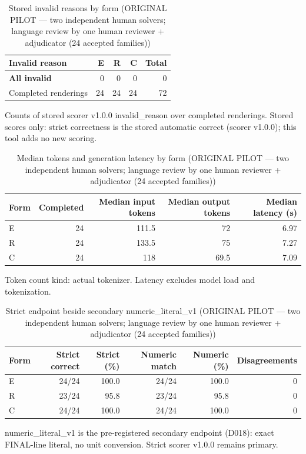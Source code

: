 \begin{table}[t]
\centering
\small
\caption{Stored invalid reasons by form (ORIGINAL PILOT --- two independent human solvers; language review by one human reviewer + adjudicator (24 accepted families))}
\label{tab:pilotorig-Qwen3-8B-invalid}
\begin{tabular}{lrrrr}
\toprule
Invalid reason & E & R & C & Total \\
\midrule
\textbf{All invalid} & 0 & 0 & 0 & 0 \\
Completed renderings & 24 & 24 & 24 & 72 \\
\bottomrule
\end{tabular}
\par\smallskip
\parbox{\linewidth}{\footnotesize Counts of stored scorer v1.0.0 invalid\_reason over completed renderings. Stored scores only: strict correctness is the stored automatic correct (scorer v1.0.0); this tool adds no new scoring.}
\end{table}

\begin{table}[t]
\centering
\small
\caption{Median tokens and generation latency by form (ORIGINAL PILOT --- two independent human solvers; language review by one human reviewer + adjudicator (24 accepted families))}
\label{tab:pilotorig-Qwen3-8B-resources}
\begin{tabular}{lrrrr}
\toprule
Form & Completed & Median input tokens & Median output tokens & Median latency (s) \\
\midrule
E & 24 & 111.5 & 72 & 6.97 \\
R & 24 & 133.5 & 75 & 7.27 \\
C & 24 & 118 & 69.5 & 7.09 \\
\bottomrule
\end{tabular}
\par\smallskip
\parbox{\linewidth}{\footnotesize Token count kind: actual tokenizer. Latency excludes model load and tokenization.}
\end{table}

\begin{table}[t]
\centering
\small
\caption{Strict endpoint beside secondary numeric\_literal\_v1 (ORIGINAL PILOT --- two independent human solvers; language review by one human reviewer + adjudicator (24 accepted families))}
\label{tab:pilotorig-Qwen3-8B-numeric}
\begin{tabular}{lrrrrr}
\toprule
Form & Strict correct & Strict (\%) & Numeric match & Numeric (\%) & Disagreements \\
\midrule
E & 24/24 & 100.0 & 24/24 & 100.0 & 0 \\
R & 23/24 & 95.8 & 23/24 & 95.8 & 0 \\
C & 24/24 & 100.0 & 24/24 & 100.0 & 0 \\
\bottomrule
\end{tabular}
\par\smallskip
\parbox{\linewidth}{\footnotesize numeric\_literal\_v1 is the pre-registered secondary endpoint (D018): exact FINAL-line literal, no unit conversion. Strict scorer v1.0.0 remains primary.}
\end{table}
